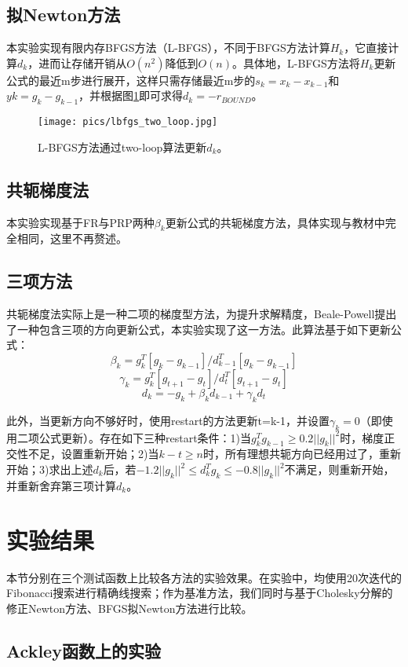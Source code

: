 \documentclass{article}
\begin{document}
\subsection{拟Newton方法}
本实验实现有限内存BFGS方法（L-BFGS），不同于BFGS方法计算$H_k$，它直接计算$d_k$，进而让存储开销从$O(n^2)$降低到$O(n)$。具体地，L-BFGS方法将$H_k$更新公式的最近m步进行展开，这样只需存储最近m步的$s_k = x_k - x_{k-1}$和$yk = g_k - g_{k-1}$，并根据图\ref{fig:lbfgs}即可求得$d_k = -r_{BOUND}$。

\begin{figure}[h]
  \centering
  \texttt{[image: pics/lbfgs\_two\_loop.jpg]}
  \caption{L-BFGS方法通过two-loop算法更新$d_k$。}
  \label{fig:lbfgs}
\end{figure}

\subsection{共轭梯度法}
本实验实现基于FR与PRP两种$\beta_k$更新公式的共轭梯度方法，具体实现与教材中完全相同，这里不再赘述。

\subsection{三项方法}
共轭梯度法实际上是一种二项的梯度型方法，为提升求解精度，Beale-Powell提出了一种包含三项的方向更新公式，本实验实现了这一方法。此算法基于如下更新公式：
\[ \beta_k = g_k^T [g_k - g_{k-1}] / d_{k-1}^T [g_k - g_{k-1}] \]
\[ \gamma_k = g_k^T [g_{t+1} - g_t] / d_t^T [g_{t+1} - g_t] \]
\[ d_k = -g_k + \beta_k d_{k-1} + \gamma_k d_{t} \]

此外，当更新方向不够好时，使用restart的方法更新t=k-1，并设置$\gamma_k=0$（即使用二项公式更新）。存在如下三种restart条件：1)当$g_k^T g_{k-1} \geq 0.2 ||g_k||^2$时，梯度正交性不足，设置重新开始；2)当$k-t\geq n$时，所有理想共轭方向已经用过了，重新开始；3)求出上述$d_k$后，若$-1.2||g_k||^2\leq d_k^T g_k\leq -0.8||g_k||^2$不满足，则重新开始，并重新舍弃第三项计算$d_k$。


\section{实验结果}
本节分别在三个测试函数上比较各方法的实验效果。在实验中，均使用20次迭代的Fibonacci搜索进行精确线搜索；作为基准方法，我们同时与基于Cholesky分解的修正Newton方法、BFGS拟Newton方法进行比较。

\subsection{Ackley函数上的实验}
\end{document}

